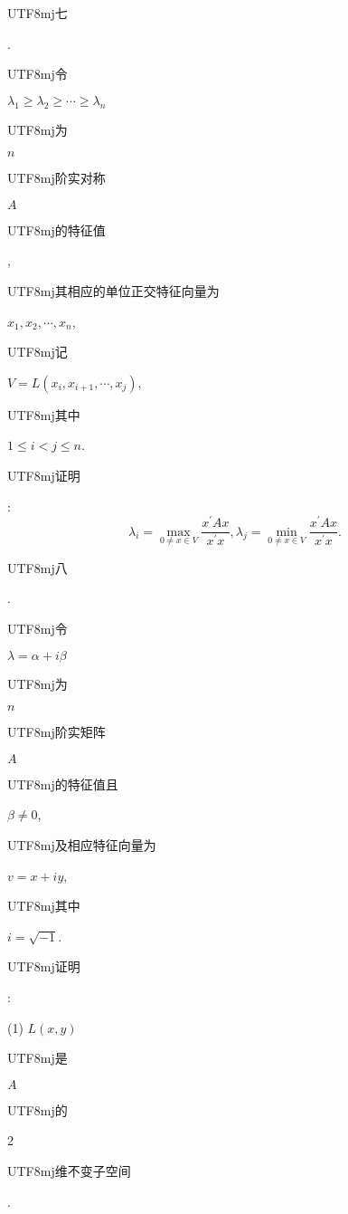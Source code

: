 \documentclass[10pt]{article}
\begin{document}
\begin{CJK}{UTF8}{mj}七\end{CJK}. \begin{CJK}{UTF8}{mj}令\end{CJK} $\lambda_{1} \geqslant \lambda_{2} \geqslant \cdots \geqslant \lambda_{n}$ \begin{CJK}{UTF8}{mj}为\end{CJK} $n$ \begin{CJK}{UTF8}{mj}阶实对称\end{CJK} $A$ \begin{CJK}{UTF8}{mj}的特征值\end{CJK}, \begin{CJK}{UTF8}{mj}其相应的单位正交特征向量为\end{CJK} $x_{1}, x_{2}, \cdots, x_{n}$, \begin{CJK}{UTF8}{mj}记\end{CJK} $V=L\left(x_{i}, x_{i+1}, \cdots, x_{j}\right)$, \begin{CJK}{UTF8}{mj}其中\end{CJK} $1 \leqslant i<j \leqslant n$. \begin{CJK}{UTF8}{mj}证明\end{CJK}:
$$
\lambda_{i}=\max _{0 \neq x \in V} \frac{x^{\prime} A x}{x^{\prime} x}, \lambda_{j}=\min _{0 \neq x \in V} \frac{x^{\prime} A x}{x^{\prime} x} .
$$
\begin{CJK}{UTF8}{mj}八\end{CJK}. \begin{CJK}{UTF8}{mj}令\end{CJK} $\lambda=\alpha+i \beta$ \begin{CJK}{UTF8}{mj}为\end{CJK} $n$ \begin{CJK}{UTF8}{mj}阶实矩阵\end{CJK} $A$ \begin{CJK}{UTF8}{mj}的特征值且\end{CJK} $\beta \neq 0$, \begin{CJK}{UTF8}{mj}及相应特征向量为\end{CJK} $v=x+i y$, \begin{CJK}{UTF8}{mj}其中\end{CJK} $i=\sqrt{-1}$. \begin{CJK}{UTF8}{mj}证明\end{CJK}:

(1) $L(x, y)$ \begin{CJK}{UTF8}{mj}是\end{CJK} $A$ \begin{CJK}{UTF8}{mj}的\end{CJK} 2 \begin{CJK}{UTF8}{mj}维不变子空间\end{CJK}.
\end{document}
